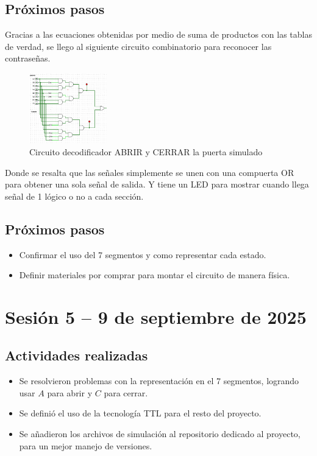\documentclass[12pt,letterpaper]{article}
\begin{document}
\subsection*{Próximos pasos}
Gracias a las ecuaciones obtenidas por medio de suma de productos con las tablas de verdad, se llego al siguiente circuito combinatorio para reconocer las contraseñas.
\begin{figure}[H]
    \centering
    \includegraphics[width=0.3\textwidth]{images/sim_decodifcador.png} %
    \caption{Circuito decodificador ABRIR y CERRAR la puerta simulado}
    \label{fig:sensores}
\end{figure}
Donde se resalta que las señales simplemente se unen con una compuerta OR para obtener una sola señal de salida. Y tiene un LED para mostrar cuando llega señal de 1 lógico o no a cada sección.

\subsection*{Próximos pasos}
\begin{itemize}
    \item Confirmar el uso del 7 segmentos y como representar cada estado.
    \item Definir materiales por comprar para montar el circuito de manera física.
\end{itemize}

\section{Sesión 5 -- 9 de septiembre de 2025}
\subsection*{Actividades realizadas}
\begin{itemize}
    \item Se resolvieron problemas con la representación en el 7 segmentos, logrando usar $A$ para abrir y $C$ para cerrar.
    \item Se definió el uso de la tecnología TTL para el resto del proyecto.
    \item Se añadieron los archivos de simulación al repositorio dedicado al proyecto, para un mejor manejo de versiones.
\end{itemize}
\end{document}
